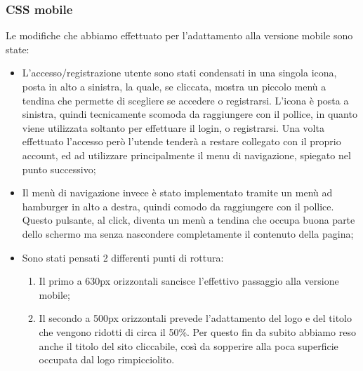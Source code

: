 \subsubsection{CSS mobile}
Le modifiche che abbiamo effettuato per l’adattamento alla versione mobile sono state:
\begin{itemize}
\item L’accesso/registrazione utente sono stati condensati in una singola icona, posta in alto a sinistra, la quale, se cliccata, mostra un piccolo menù a tendina che permette di scegliere se accedere o registrarsi. L'icona è posta a sinistra, quindi tecnicamente scomoda da raggiungere con il pollice, in quanto viene utilizzata soltanto per effettuare il login, o registrarsi. Una volta effettuato l'accesso però l'utende tenderà a restare collegato con il proprio account, ed ad utilizzare principalmente il menu di navigazione, spiegato nel punto successivo;
\item Il menù di navigazione invece è stato implementato tramite un menù ad hamburger in alto a destra, quindi comodo da raggiungere con il pollice. Questo pulsante, al click, diventa un menù a tendina che occupa buona parte dello schermo ma senza nascondere completamente il contenuto della pagina;
\item Sono stati pensati 2 differenti punti di rottura:
\begin{enumerate}
\item Il primo a 630px orizzontali sancisce l’effettivo passaggio alla versione mobile;
\item Il secondo a 500px orizzontali prevede l’adattamento del logo e del titolo che vengono ridotti di circa il 50\%. Per questo fin da subito abbiamo reso anche il titolo del sito cliccabile, così da sopperire alla poca superficie occupata dal logo rimpicciolito.
\end{enumerate}
\end{itemize}

